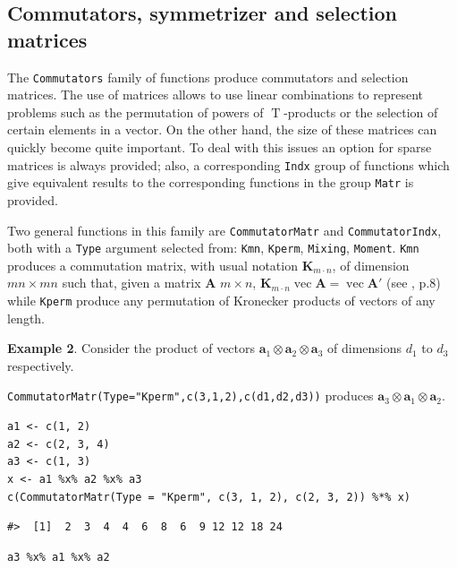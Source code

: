 \hypertarget{commutators-symmetrizer-and-selection-matrices}{%
\subsection{Commutators, symmetrizer and selection matrices}\label{commutators-symmetrizer-and-selection-matrices}}

The \texttt{Commutators} family of functions produce commutators and selection matrices. The use of matrices allows to use linear combinations to represent problems such as the permutation of powers of \(\operatorname{T}\)-products or the selection of certain elements in a vector. On the other hand, the size of these matrices can quickly become quite important. To deal with this issues an option for sparse matrices is always provided; also, a corresponding \texttt{Indx} group of functions which give equivalent results to the corresponding functions in the group \texttt{Matr} is provided.

Two general functions in this family are \texttt{CommutatorMatr} and \texttt{CommutatorIndx}, both with a \texttt{Type} argument selected from: \texttt{Kmn}, \texttt{Kperm}, \texttt{Mixing}, \texttt{Moment}. \texttt{Kmn} produces a commutation matrix, with usual notation \(\mathbf{K}_{m \cdot n}\), of dimension \(mn \times mn\) such that, given a matrix \(\mathbf{A}\) \(m\times n\), \(\mathbf{K}_{m \cdot n} \operatorname{vec}\mathbf{A}=\operatorname{vec}\mathbf{A}'\) (see \citet{terdik2021multivariate}, p.8) while \texttt{Kperm} produce any permutation of Kronecker products of vectors of any length.

\textbf{Example 2}. Consider the product of vectors \(\mathbf{a}_1 \otimes \mathbf{a}_2 \otimes\mathbf{a}_3\) of dimensions \(d_1\) to \(d_3\) respectively.

\texttt{CommutatorMatr(Type="Kperm",c(3,1,2),c(d1,d2,d3))} produces \(\mathbf{a}_3 \otimes \mathbf{a}_1 \otimes\mathbf{a}_2\).

\begin{verbatim}
a1 <- c(1, 2)
a2 <- c(2, 3, 4)
a3 <- c(1, 3)
x <- a1 %x% a2 %x% a3
c(CommutatorMatr(Type = "Kperm", c(3, 1, 2), c(2, 3, 2)) %*% x)
\end{verbatim}

\begin{verbatim}
#>  [1]  2  3  4  4  6  8  6  9 12 12 18 24
\end{verbatim}

\begin{verbatim}
a3 %x% a1 %x% a2
\end{verbatim}

